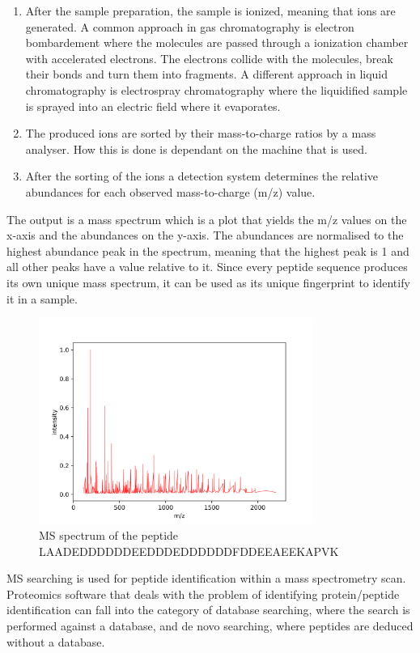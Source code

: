 \documentclass[12pt]{article}
\begin{document}
\begin{enumerate}
\item After the sample preparation, the sample is ionized, meaning that ions are generated. A common approach in gas chromatography is electron bombardement where the molecules are passed through a ionization chamber with accelerated electrons. The electrons collide with the molecules, break their bonds and turn them into fragments. A different approach in liquid
chromatography is electrospray chromatography where the liquidified sample is sprayed into an electric field where it evaporates.
\item The produced ions are sorted by their mass-to-charge ratios by a mass analyser. How this is done is dependant on the machine that is used.
\item After the sorting of the ions a detection system determines the relative abundances for each observed mass-to-charge (m/z) value.
\end{enumerate} 

The output is a mass spectrum which is a plot that yields the m/z values on the x-axis and the abundances on the y-axis. The abundances are normalised to the highest abundance peak in the spectrum, meaning that the highest peak is 1 and all other peaks have a value relative to it. Since every peptide sequence produces its own unique mass spectrum, it can be used as its unique fingerprint to identify it in a sample. 
\begin{figure}[ht]
    \centering
    \includegraphics[width=0.8\textwidth]{figs/peptide.png}
    \caption{MS spectrum of the peptide LAADEDDDDDDEEDDDEDDDDDDFDDEEAEEKAPVK}
    \label{fig:tandem-spectrum}
\end{figure}

MS searching is used for peptide identification within a mass spectrometry scan. Proteomics software that deals with the problem of identifying protein/peptide identification can fall into the category of database searching, where the search is performed against a database, and de novo searching, where peptides are deduced without a database.
\end{document}
